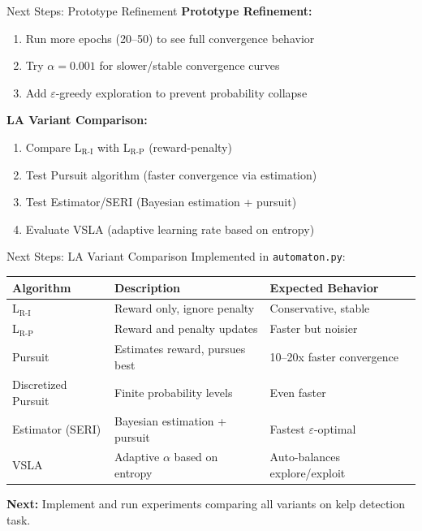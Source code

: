 \documentclass[10pt,xcolor={table,dvipsnames},t]{beamer}
\begin{document}
\begin{frame}{Next Steps: Prototype Refinement}
\small
\textbf{Prototype Refinement:}
\begin{enumerate}
  \item Run more epochs (20--50) to see full convergence behavior
  \item Try $\alpha=0.001$ for slower/stable convergence curves
  \item Add $\varepsilon$-greedy exploration to prevent probability collapse
\end{enumerate}

\vspace{0.3em}
\textbf{LA Variant Comparison:}
\begin{enumerate}
  \item Compare L$_{\text{R-I}}$ with L$_{\text{R-P}}$ (reward-penalty)
  \item Test Pursuit algorithm (faster convergence via estimation)
  \item Test Estimator/SERI (Bayesian estimation + pursuit)
  \item Evaluate VSLA (adaptive learning rate based on entropy)
\end{enumerate}

\end{frame}

\begin{frame}{Next Steps: LA Variant Comparison}
\small
Implemented in \texttt{automaton.py}:

\vspace{0.3em}
\begin{table}
\centering
\footnotesize
\begin{tabular}{lll}
\toprule
\textbf{Algorithm} & \textbf{Description} & \textbf{Expected Behavior} \\
\midrule
L$_{\text{R-I}}$ & Reward only, ignore penalty & Conservative, stable \\
L$_{\text{R-P}}$ & Reward and penalty updates & Faster but noisier \\
Pursuit & Estimates reward, pursues best & 10--20x faster convergence \\
Discretized Pursuit & Finite probability levels & Even faster \\
Estimator (SERI) & Bayesian estimation + pursuit & Fastest $\varepsilon$-optimal \\
VSLA & Adaptive $\alpha$ based on entropy & Auto-balances explore/exploit \\
\bottomrule
\end{tabular}
\end{table}

\vspace{0.3em}
\textbf{Next:} Implement and run experiments comparing all variants on kelp detection task.

\end{frame}
\end{document}
